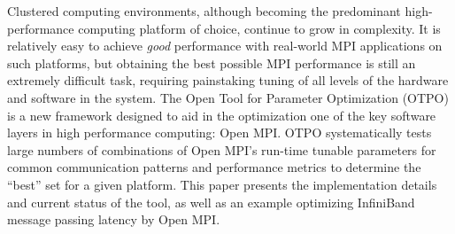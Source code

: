 Clustered computing environments, although becoming the predominant
high-performance computing platform of choice, continue to grow in
complexity.  
%
It is relatively easy to achieve {\em good} performance with
real-world MPI applications on such platforms, but obtaining the best
possible MPI performance is still an extremely difficult task,
requiring painstaking tuning of all levels of the hardware and
software in the system.
%
The Open Tool for Parameter Optimization (OTPO) is a new framework
designed to aid in the optimization one of the key software layers in
high performance computing: Open MPI.
%
OTPO systematically tests large numbers of combinations of Open MPI's
run-time tunable parameters for common communication patterns and
performance metrics to determine the ``best'' set for a given
platform.
%
This paper presents the implementation details and current status of
the tool, as well as an example optimizing InfiniBand message passing
latency by Open MPI.
